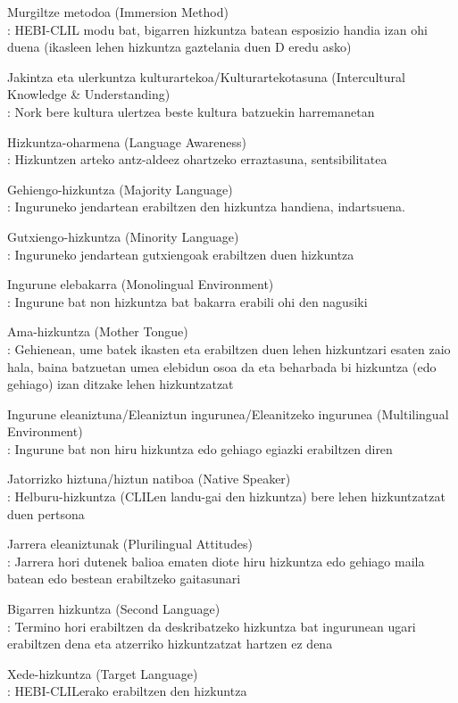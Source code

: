\documentclass[
]{book}
\begin{document}
Murgiltze metodoa (Immersion Method)\\
: HEBI-CLIL modu bat, bigarren hizkuntza batean esposizio handia izan ohi duena (ikasleen lehen hizkuntza gaztelania duen D eredu asko)

Jakintza eta ulerkuntza kulturartekoa/Kulturartekotasuna (Intercultural Knowledge \& Understanding)\\
: Nork bere kultura ulertzea beste kultura batzuekin harremanetan

Hizkuntza-oharmena (Language Awareness)\\
: Hizkuntzen arteko antz-aldeez ohartzeko erraztasuna, sentsibilitatea

Gehiengo-hizkuntza (Majority Language)\\
: Inguruneko jendartean erabiltzen den hizkuntza handiena, indartsuena.

Gutxiengo-hizkuntza (Minority Language)\\
: Inguruneko jendartean gutxiengoak erabiltzen duen hizkuntza

Ingurune elebakarra (Monolingual Environment)\\
: Ingurune bat non hizkuntza bat bakarra erabili ohi den nagusiki

Ama-hizkuntza (Mother Tongue)\\
: Gehienean, ume batek ikasten eta erabiltzen duen lehen hizkuntzari esaten zaio hala, baina batzuetan umea elebidun osoa da eta beharbada bi hizkuntza (edo gehiago) izan ditzake lehen hizkuntzatzat

Ingurune eleaniztuna/Eleaniztun ingurunea/Eleanitzeko ingurunea (Multilingual Environment)\\
: Ingurune bat non hiru hizkuntza edo gehiago egiazki erabiltzen diren

Jatorrizko hiztuna/hiztun natiboa (Native Speaker)\\
: Helburu-hizkuntza (CLILen landu-gai den hizkuntza) bere lehen hizkuntzatzat duen pertsona

Jarrera eleaniztunak (Plurilingual Attitudes)\\
: Jarrera hori dutenek balioa ematen diote hiru hizkuntza edo gehiago maila batean edo bestean erabiltzeko gaitasunari

Bigarren hizkuntza (Second Language)\\
: Termino hori erabiltzen da deskribatzeko hizkuntza bat ingurunean ugari erabiltzen dena eta atzerriko hizkuntzatzat hartzen ez dena

Xede-hizkuntza (Target Language)\\
: HEBI-CLILerako erabiltzen den hizkuntza
\end{document}
